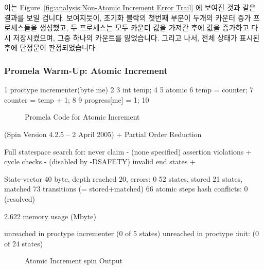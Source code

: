 이는
Figure~\ref{fig:analysis:Non-Atomic Increment Error Trail}
에 보여진 것과 같은 결과를 보일 겁니다.
보여지듯이, 초기화 블락의 첫번째 부분이 두개의 카운터 증가 프로세스들을
생성했고, 두 프로세스는 모두 카운터 값을 가져간 후에 값을 증가하고 다시
저장시켰으며, 그중 하나의 카운트를 잃었습니다.
그리고 나서, 전체 상태가 표시된 후에 단정문이 판정되었습니다.
\iffalse

This gives the output shown in
Figure~\ref{fig:analysis:Non-Atomic Increment Error Trail}.
As can be seen, the first portion of the init block created both
incrementer processes, both of which first fetched the counter,
then both incremented and stored it, losing a count.
The assertion then triggered, after which the global state is displayed.
\fi

\subsubsection{Promela Warm-Up: Atomic Increment}
\label{sec:formal:Promela Warm-Up: Atomic Increment}

{ \scriptsize
\begin{verbbox}
  1 proctype incrementer(byte me)
  2 {
  3   int temp;
  4
  5   atomic {
  6     temp = counter;
  7     counter = temp + 1;
  8   }
  9   progress[me] = 1;
 10 }
\end{verbbox}
}
\begin{figure}[htbp]
\centering
\theverbbox
\caption{Promela Code for Atomic Increment}
\label{fig:analysis:Promela Code for Atomic Increment}
\end{figure}

{ \scriptsize
\begin{verbbox}
(Spin Version 4.2.5 -- 2 April 2005)
        + Partial Order Reduction

Full statespace search for:
        never claim             - (none specified)
        assertion violations    +
        cycle checks            - (disabled by -DSAFETY)
        invalid end states      +

State-vector 40 byte, depth reached 20, errors: 0
      52 states, stored
      21 states, matched
      73 transitions (= stored+matched)
      66 atomic steps
hash conflicts: 0 (resolved)

2.622   memory usage (Mbyte)

unreached in proctype incrementer
        (0 of 5 states)
unreached in proctype :init:
        (0 of 24 states)
\end{verbbox}
}
\begin{figure}[htbp]
\centering
\theverbbox
\caption{Atomic Increment spin Output}
\label{fig:analysis:Atomic Increment spin Output}
\end{figure}

